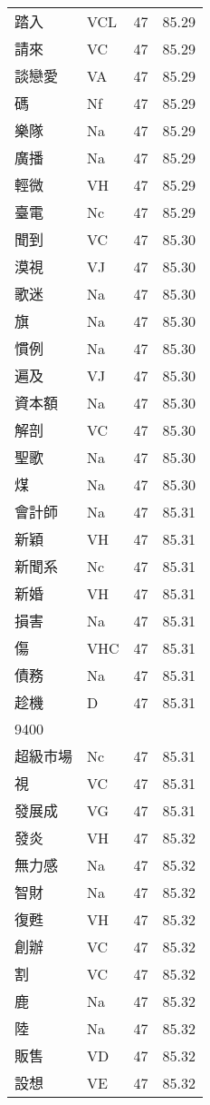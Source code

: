 \documentclass[twocolumn]{book}
\begin{document}
\begin{supertabular}{llrr}
踏入 & VCL & 47 &  85.29\\
請來 & VC & 47 &  85.29\\
談戀愛 & VA & 47 &  85.29\\
碼 & Nf & 47 &  85.29\\
樂隊 & Na & 47 &  85.29\\
廣播 & Na & 47 &  85.29\\
輕微 & VH & 47 &  85.29\\
臺電 & Nc & 47 &  85.29\\
聞到 & VC & 47 &  85.30\\
漠視 & VJ & 47 &  85.30\\
歌迷 & Na & 47 &  85.30\\
旗 & Na & 47 &  85.30\\
慣例 & Na & 47 &  85.30\\
遍及 & VJ & 47 &  85.30\\
資本額 & Na & 47 &  85.30\\
解剖 & VC & 47 &  85.30\\
聖歌 & Na & 47 &  85.30\\
煤 & Na & 47 &  85.30\\
會計師 & Na & 47 &  85.31\\
新穎 & VH & 47 &  85.31\\
新聞系 & Nc & 47 &  85.31\\
新婚 & VH & 47 &  85.31\\
損害 & Na & 47 &  85.31\\
傷 & VHC & 47 &  85.31\\
債務 & Na & 47 &  85.31\\
趁機 & D & 47 &  85.31\\
9400\\
超級市場 & Nc & 47 &  85.31\\
視 & VC & 47 &  85.31\\
發展成 & VG & 47 &  85.31\\
發炎 & VH & 47 &  85.32\\
無力感 & Na & 47 &  85.32\\
智財 & Na & 47 &  85.32\\
復甦 & VH & 47 &  85.32\\
創辦 & VC & 47 &  85.32\\
割 & VC & 47 &  85.32\\
鹿 & Na & 47 &  85.32\\
陸 & Na & 47 &  85.32\\
販售 & VD & 47 &  85.32\\
設想 & VE & 47 &  85.32\\

\end{supertabular}
\end{document}
